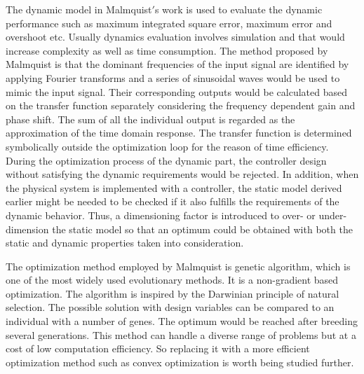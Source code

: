 The dynamic model in Malmquist$'$s work is used to evaluate the dynamic performance such as maximum integrated square error, maximum error and overshoot etc. Usually dynamics evaluation involves simulation and that would increase complexity as well as time consumption. The method proposed by Malmquist is that the dominant frequencies of the input signal are identified by applying Fourier transforms and
a series of sinusoidal waves would be used to mimic the input signal. Their corresponding outputs would be calculated based on the transfer function separately considering the frequency dependent gain and phase shift. The sum of all the individual output is regarded as the approximation of the time domain response. The transfer function is determined symbolically outside the optimization loop for the reason of time efficiency. During the optimization process of the dynamic part, the controller design without satisfying the dynamic requirements would be rejected. In addition, when the physical system is implemented with a controller, the static model derived earlier might be needed to be checked if it also fulfills the requirements of the dynamic behavior. Thus, a dimensioning factor is introduced to over- or under-dimension the static model so that an optimum could be obtained with both the static and dynamic properties taken into consideration.      

The optimization method employed by Malmquist is genetic algorithm, which is one of the most widely used evolutionary methods. It is a non-gradient based optimization. The algorithm is inspired by the Darwinian principle of natural selection. The possible solution with design variables can be compared to an individual with a number of genes. The optimum would be reached after breeding several generations. This method can handle a diverse range of problems but at a cost of low computation efficiency. So replacing it with a more efficient optimization method such as convex optimization is worth being studied further.